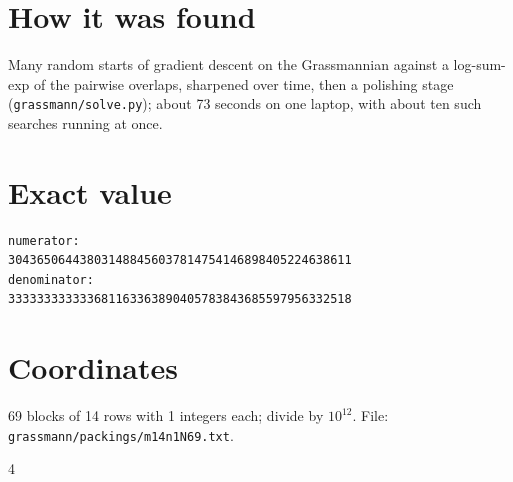 \documentclass[11pt,a4paper]{article}
\begin{document}
\section{How it was found}
Many random starts of gradient descent on the Grassmannian against a log-sum-exp of the pairwise overlaps, sharpened over time, then a polishing stage (\texttt{grassmann/solve.py}); about 73 seconds on one laptop, with about ten such searches running at once.


\appendix
\section{Exact value}
{\small
\begin{verbatim}
numerator:
304365064438031488456037814754146898405224638611
denominator:
333333333333681163363890405783843685597956332518
\end{verbatim}}

\section{Coordinates}
69 blocks of 14 rows with 1 integers each; divide by $10^{12}$. File: \texttt{grassmann/packings/m14n1N69.txt}.
{\tiny
\begin{multicols}{4}
\end{multicols}}
\end{document}
